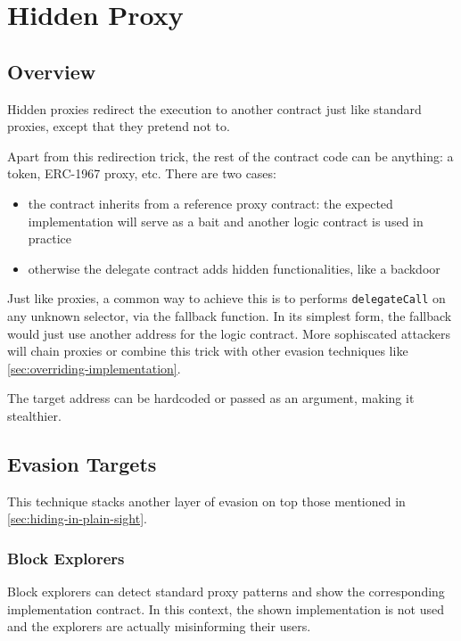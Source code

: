 \section{Hidden Proxy} \label{sec:hidden-proxy}

\subsection{Overview}

Hidden proxies redirect the execution to another contract just like standard proxies, except that they pretend not to.

Apart from this redirection trick, the rest of the contract code can be anything: a token, ERC-1967 proxy, etc.
There are two cases:

\begin{itemize}
\item{the contract inherits from a reference proxy contract: the expected implementation will serve as a bait and another logic contract is used in practice}
\item{otherwise the delegate contract adds hidden functionalities, like a backdoor}
\end{itemize}

Just like proxies, a common way to achieve this is to performs \lstinline{delegateCall} on any unknown selector, via the fallback function.
In its simplest form, the fallback would just use another address for the logic contract.
More sophiscated attackers will chain proxies or combine this trick with other evasion techniques like \ref{sec:overriding-implementation}.

The target address can be hardcoded or passed as an argument, making it stealthier.

\subsection{Evasion Targets}

This technique stacks another layer of evasion on top those mentioned in \ref{sec:hiding-in-plain-sight}.

\subsubsection{Block Explorers}

Block explorers can detect standard proxy patterns and show the corresponding implementation contract.
In this context, the shown implementation is not used and the explorers are actually misinforming their users.

